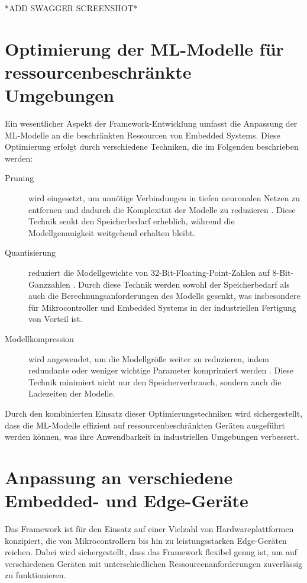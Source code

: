 *ADD SWAGGER SCREENSHOT*

\section{Optimierung der ML-Modelle für ressourcenbeschränkte Umgebungen}

Ein wesentlicher Aspekt der Framework-Entwicklung umfasst die Anpassung der ML-Modelle an die beschränkten Ressourcen von Embedded Systems. 
Diese Optimierung erfolgt durch verschiedene Techniken, die im Folgenden beschrieben werden:

\begin{description}
    \item[Pruning] wird eingesetzt, um unnötige Verbindungen in tiefen neuronalen Netzen zu entfernen und dadurch die Komplexität der Modelle zu reduzieren \cite{10.1145/3664647.3681449}. 
    Diese Technik senkt den Speicherbedarf erheblich, während die Modellgenauigkeit weitgehend erhalten bleibt.

    \item[Quantisierung] reduziert die Modellgewichte von 32-Bit-Floating-Point-Zahlen auf 8-Bit-Ganzzahlen \cite{10.1145/3368826.3377912}. Durch diese Technik werden sowohl der 
    Speicherbedarf als auch die Berechnungsanforderungen des Modells gesenkt, was insbesondere für Mikrocontroller und Embedded Systems in der industriellen Fertigung von Vorteil ist.

    \item[Modellkompression] wird angewendet, um die Modellgröße weiter zu reduzieren, indem redundante oder weniger wichtige Parameter komprimiert werden \cite{10.1145/3613904.3642109}. 
    Diese Technik minimiert nicht nur den Speicherverbrauch, sondern auch die Ladezeiten der Modelle.
\end{description}

Durch den kombinierten Einsatz dieser Optimierungstechniken wird sichergestellt, dass die ML-Modelle effizient auf ressourcenbeschränkten Geräten ausgeführt werden können, was ihre 
Anwendbarkeit in industriellen Umgebungen verbessert.

\section{Anpassung an verschiedene Embedded- und Edge-Geräte}

Das Framework ist für den Einsatz auf einer Vielzahl von Hardwareplattformen konzipiert, die von Mikrocontrollern bis hin zu leistungsstarken Edge-Geräten reichen. 
Dabei wird sichergestellt, dass das Framework flexibel genug ist, um auf verschiedenen Geräten mit unterschiedlichen Ressourcenanforderungen zuverlässig zu funktionieren.

